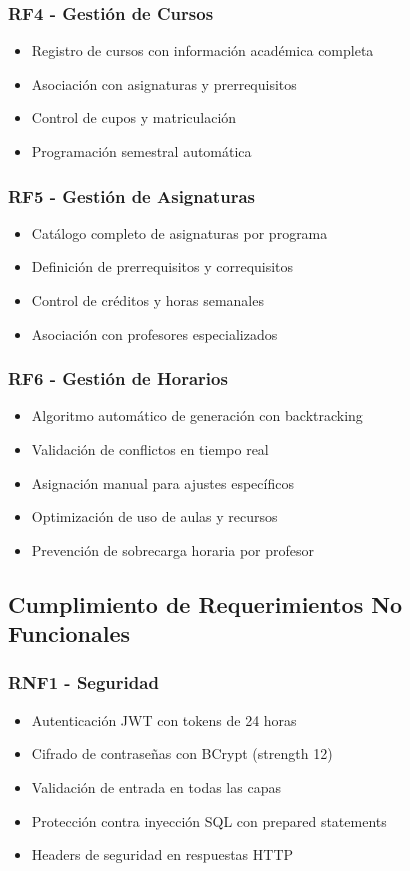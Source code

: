 \subsubsection{RF4 - Gestión de Cursos}
\begin{itemize}
\item Registro de cursos con información académica completa
\item Asociación con asignaturas y prerrequisitos
\item Control de cupos y matriculación
\item Programación semestral automática
\end{itemize}

\subsubsection{RF5 - Gestión de Asignaturas}
\begin{itemize}
\item Catálogo completo de asignaturas por programa
\item Definición de prerrequisitos y correquisitos
\item Control de créditos y horas semanales
\item Asociación con profesores especializados
\end{itemize}

\subsubsection{RF6 - Gestión de Horarios}
\begin{itemize}
\item Algoritmo automático de generación con backtracking
\item Validación de conflictos en tiempo real
\item Asignación manual para ajustes específicos
\item Optimización de uso de aulas y recursos
\item Prevención de sobrecarga horaria por profesor
\end{itemize}

\subsection{Cumplimiento de Requerimientos No Funcionales}

\subsubsection{RNF1 - Seguridad}
\begin{itemize}
\item Autenticación JWT con tokens de 24 horas
\item Cifrado de contraseñas con BCrypt (strength 12)
\item Validación de entrada en todas las capas
\item Protección contra inyección SQL con prepared statements
\item Headers de seguridad en respuestas HTTP
\end{itemize}

